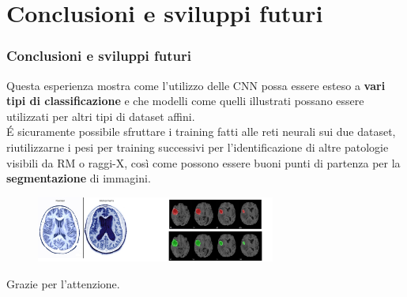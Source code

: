 \documentclass{beamer}
\begin{document}

\section{Conclusioni e sviluppi futuri}
\begin{frame}
	\frametitle{Conclusioni e sviluppi futuri}
	Questa esperienza mostra come l'utilizzo delle CNN possa essere esteso a \textbf{vari tipi di classificazione} e che 
	modelli come quelli illustrati possano essere utilizzati per altri tipi di dataset affini. \\
	É sicuramente possibile sfruttare
	i training fatti alle reti neurali sui due dataset, riutilizzarne i pesi per training successivi
	 per l'identificazione di altre patologie visibili da RM o raggi-X, così come possono essere buoni punti di partenza per 
	 la \textbf{segmentazione} di immagini.
	 \begin{figure}
		\includegraphics[width=0.7\textwidth]{alzheimer.jpg}
	\end{figure}

\end{frame}


\begin{frame}
	\centering
	\bigskip
	Grazie per l'attenzione.
		
	
\end{frame}		


\begin{frame}

\end{frame}
\end{document}
